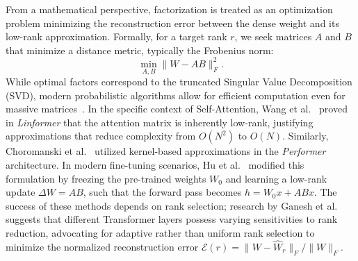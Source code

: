 From a mathematical perspective, factorization is treated as an optimization problem minimizing the reconstruction error between the dense weight and its low-rank approximation. Formally, for a target rank $r$, we seek matrices $A$ and $B$ that minimize a distance metric, typically the Frobenius norm:
\begin{equation}
  \min_{A,B} \|W - AB\|_F^2.
  \label{eq:factorization_opt}
\end{equation}
While optimal factors correspond to the truncated Singular Value Decomposition (SVD), modern probabilistic algorithms allow for efficient computation even for massive matrices~\cite{halko2011finding}. In the specific context of Self-Attention, Wang et al.~\cite{wang2020linformer} proved in \textit{Linformer} that the attention matrix is inherently low-rank, justifying approximations that reduce complexity from $O(N^2)$ to $O(N)$. Similarly, Choromanski et al.~\cite{choromanski2020rethinking} utilized kernel-based approximations in the \textit{Performer} architecture. In modern fine-tuning scenarios, Hu et al.~\cite{hu2021lora} modified this formulation by freezing the pre-trained weights $W_0$ and learning a low-rank update $\Delta W = AB$, such that the forward pass becomes $h = W_0 x + ABx$. The success of these methods depends on rank selection; research by Ganesh et al.~\cite{ganesh2021compressing} suggests that different Transformer layers possess varying sensitivities to rank reduction, advocating for adaptive rather than uniform rank selection to minimize the normalized reconstruction error $\mathcal{E}(r) = \|W - \hat{W}_r\|_F / \|W\|_F$.


